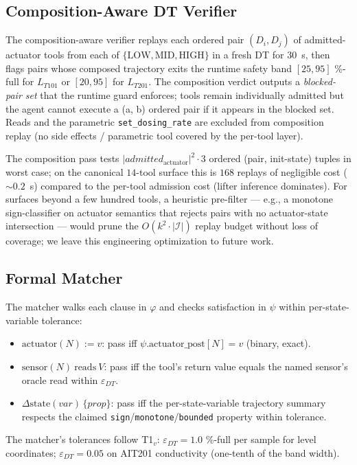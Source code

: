 \subsection{Composition-Aware DT Verifier}

The composition-aware verifier replays each ordered pair
$(D_i, D_j)$ of admitted-actuator tools from each of $\{\text{LOW},
\text{MID}, \text{HIGH}\}$ in a fresh DT for $30$~s, then flags pairs
whose composed trajectory exits the runtime safety band $[25, 95]$
\%-full for $L_{T101}$ or $[20, 95]$ for $L_{T201}$. The composition
verdict outputs a \emph{blocked-pair set} that the runtime guard
enforces; tools remain individually admitted but the agent cannot
execute a (a, b) ordered pair if it appears in the blocked set. Reads
and the parametric \texttt{set\_dosing\_rate} are excluded from
composition replay (no side effects / parametric tool covered by the
per-tool layer).

The composition pass tests $|admitted_{\text{actuator}}|^2 \cdot 3$
ordered (pair, init-state) tuples in worst case; on the canonical
$14$-tool surface this is $168$ replays of negligible cost ($\sim
0.2$~s) compared to the per-tool admission cost (lifter inference
dominates). For surfaces beyond a few hundred tools, a heuristic
pre-filter --- e.g., a monotone sign-classifier on actuator semantics
that rejects pairs with no actuator-state intersection --- would prune
the $O(k^2 \cdot |\mathcal{I}|)$ replay budget without loss of
coverage; we leave this engineering optimization to future work.

\subsection{Formal Matcher}

The matcher walks each clause in $\varphi$ and checks satisfaction
in $\psi$ within per-state-variable tolerance:
\begin{itemize}
\item $\text{actuator}(N) := v$: pass iff $\psi.\text{actuator\_post}[N]
      = v$ (binary, exact).
\item $\text{sensor}(N)\ \text{reads}\ V$: pass iff the tool's
      return value equals the named sensor's oracle read within
      $\varepsilon_{DT}$.
\item $\Delta\text{state}(\textit{var})\,\{\textit{prop}\}$: pass iff
      the per-state-variable trajectory summary respects the claimed
      \texttt{sign}/\texttt{monotone}/\texttt{bounded} property within
      tolerance.
\end{itemize}
The matcher's tolerances follow T1${}_v$: $\varepsilon_{DT} = 1.0$
\%-full per sample for level coordinates; $\varepsilon_{DT} = 0.05$
on AIT201 conductivity (one-tenth of the band width).

